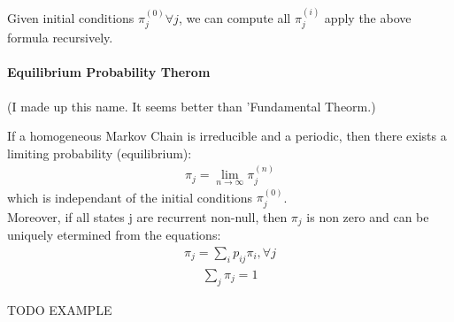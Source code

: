 Given initial conditions $\pi_j^{(0)} \forall j$, we can compute all
$\pi_j^{(i)}$ apply the above formula recursively.

\paragraph{Equilibrium Probability Therom} (I made up this name. It seems better
than 'Fundamental Theorm.)

If a homogeneous Markov Chain is irreducible and a periodic, then there exists a
limiting probability (equilibrium):
\begin{equation*} \begin{split}
	\pi_j = \lim_{n \to \infty} \pi_j^{(n)}
\end{split} \end{equation*}
which is independant of the initial conditions $\pi_j^{(0)}$. \\[0.5cm]

Moreover, if all states j are recurrent non-null, then $\pi_j$ is non zero and
can be uniquely etermined from the equations:
\begin{equation*} \begin{split}
	\pi_j = \sum_i p_{ij} \pi_i , \forall j
\end{split} \end{equation*}
\begin{equation*} \begin{split}
	\sum_j \pi_j = 1
\end{split} \end{equation*}

TODO EXAMPLE

\begin{equation*} \begin{split}
\end{split} \end{equation*}












